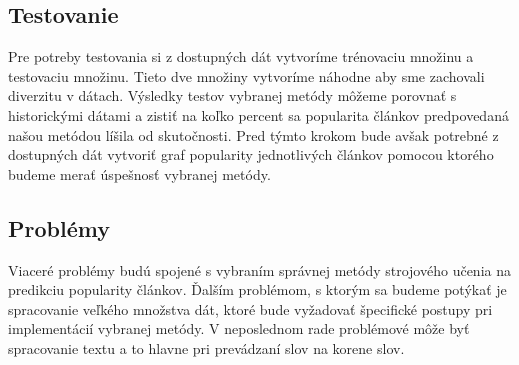 \documentclass[runningheads,a4paper]{llncs}
\begin{document}
\subsection{Testovanie}
Pre potreby testovania si z dostupných dát vytvoríme trénovaciu množinu 
a testovaciu množinu. Tieto dve množiny vytvoríme náhodne aby sme zachovali diverzitu v dátach. Výsledky testov vybranej metódy môžeme porovnať s 
historickými dátami a zistiť na koľko percent sa popularita článkov predpovedaná 
našou metódou líšila od skutočnosti. Pred týmto krokom bude avšak potrebné z 
dostupných dát vytvoriť graf popularity jednotlivých článkov pomocou ktorého 
budeme merať úspešnosť vybranej metódy.

\subsection{Problémy}
Viaceré problémy budú spojené s vybraním správnej metódy strojového učenia na 
predikciu popularity článkov. Ďalším problémom, s ktorým sa budeme potýkať je 
spracovanie veľkého množstva dát, ktoré bude vyžadovať špecifické postupy pri 
implementácií vybranej metódy. V neposlednom rade problémové môže byť 
spracovanie textu a to hlavne pri prevádzaní slov na korene slov.
\end{document}
